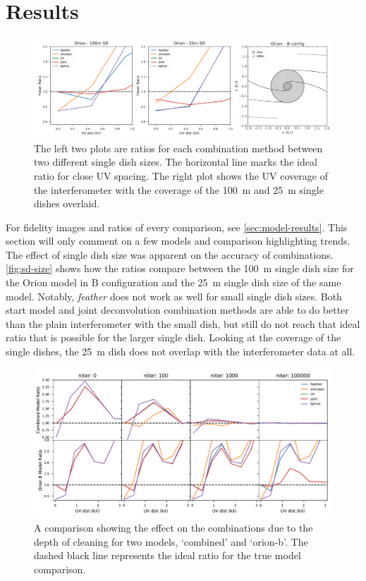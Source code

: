 \documentclass[manuscript,linenumbers]{aastex62}
\begin{document}

\section{Results}

\begin{figure}[ht]
    \includegraphics[width=\textwidth]{figures/sd-size-comp}
    \caption{The left two plots are ratios for each combination method between two different single dish sizes. The horizontal line marks the ideal ratio for close UV spacing. The right plot shows the UV coverage of the interferometer with the coverage of the \SI{100}{\meter} and \SI{25}{\meter} single dishes overlaid.}
    \label{fig:sd-size}
\end{figure}

For fidelity images and ratios of every comparison, see \autoref{sec:model-results}. This section will only comment on a few models and comparison highlighting trends. The effect of single dish size was apparent on the accuracy of combinations. \autoref{fig:sd-size} shows how the ratios compare between the \SI{100}{\meter} single dish size for the Orion model in B configuration and the \SI{25}{\meter} single dish size of the same model. Notably, \textit{feather} does not work as well for small single dish sizes. Both start model and joint deconvolution combination methods are able to do better than the plain interferometer with the small dish, but still do not reach that ideal ratio that is possible for the larger single dish. Looking at the coverage of the single dishes, the \SI{25}{\meter} dish does not overlap with the interferometer data at all.

\begin{figure}[ht]
    \includegraphics[width=\textwidth]{figures/iter-plot}
    \caption{A comparison showing the effect on the combinations due to the depth of cleaning for two models, `combined' and `orion-b'. The dashed black line represents the ideal ratio for the true model comparison. }
    \label{fig:iters}
\end{figure}
\end{document}
